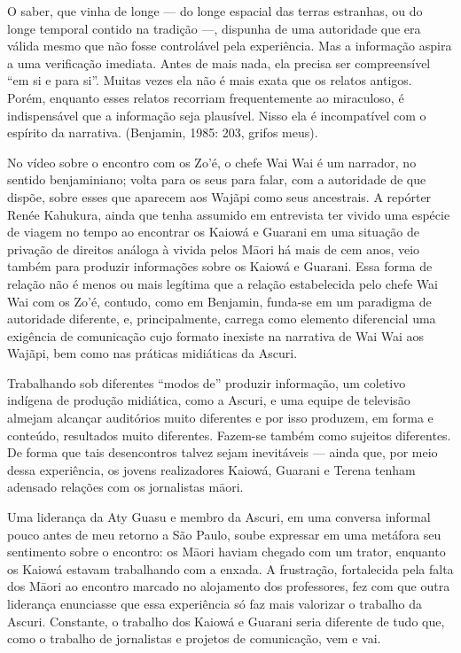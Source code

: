 O saber, que vinha de longe — do longe espacial das terras estranhas, ou
do longe temporal contido na tradição —, dispunha de uma autoridade que
era válida mesmo que não fosse controlável pela experiência. Mas a
informação aspira a uma verificação imediata. Antes de mais nada, ela
precisa ser compreensível ``em si e para si''. Muitas vezes ela não é
mais exata que os relatos antigos. Porém, enquanto esses relatos
recorriam frequentemente ao miraculoso, é indispensável que a
informação seja plausível. Nisso ela é incompatível com o espírito da
narrativa. (Benjamin, 1985: 203, grifos meus).

No vídeo sobre o encontro com os Zo’é, o chefe Wai Wai é um narrador, no
sentido benjaminiano; volta para os seus para falar, com a autoridade de que dispõe, sobre esses que aparecem aos Wajãpi como seus
ancestrais. A repórter Renée Kahukura, ainda que tenha assumido em
entrevista ter vivido uma espécie de viagem no tempo ao encontrar os
Kaiowá e Guarani em uma situação de privação de direitos análoga à
vivida pelos M\=aori há mais de cem anos, veio também para produzir
informações sobre os Kaiowá e Guarani. Essa forma de relação não é
menos ou mais legítima que a relação estabelecida pelo chefe Wai Wai
com os Zo’é, contudo, como em Benjamin, funda-se em um paradigma de
autoridade diferente, e, principalmente, carrega como elemento
diferencial uma exigência de comunicação cujo formato inexiste na
narrativa de Wai Wai aos Wajãpi, bem como nas práticas midiáticas da
Ascuri.

Trabalhando sob diferentes ``modos de'' produzir informação, um coletivo
indígena de produção midiática, como a Ascuri, e uma equipe de
televisão almejam alcançar auditórios muito diferentes e por isso
produzem, em forma e conteúdo, resultados muito diferentes. Fazem-se
também como sujeitos diferentes. De forma que tais desencontros talvez
sejam inevitáveis — ainda que, por meio dessa experiência, os jovens
realizadores Kaiowá, Guarani e Terena tenham adensado relações com os
jornalistas m\=aori.

Uma liderança da Aty Guasu e membro da Ascuri, em uma conversa informal
pouco antes de meu retorno a São Paulo, soube expressar em uma metáfora
seu sentimento sobre o encontro: os M\=aori haviam chegado com um
trator, enquanto os Kaiowá estavam trabalhando com a enxada. A
frustração, fortalecida pela falta dos M\=aori ao encontro marcado no
alojamento dos professores, fez com que outra liderança enunciasse que
essa experiência só faz mais valorizar o trabalho da Ascuri. Constante,
o trabalho dos Kaiowá e Guarani seria diferente de tudo que, como o
trabalho de jornalistas e projetos de comunicação, vem e vai.

